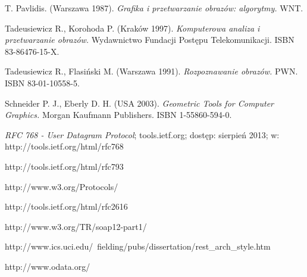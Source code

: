 \begin{thebibliography}{}

  T. Pavlidis.
  (Warszawa 1987).
  \emph{Grafika i przetwarzanie obrazów: algorytmy.}
  WNT.

  Tadeusiewicz R., Korohoda P.
  (Kraków 1997).
  \emph{Komputerowa analiza i przetwarzanie obrazów.}
  Wydawnictwo Fundacji Postępu Telekomunikacji.
  ISBN 83-86476-15-X.

  Tadeusiewicz R., Flasiński M.
  (Warszawa 1991).
  \emph{Rozpoznawanie obrazów.}
  PWN.
  ISBN 83-01-10558-5.
  
  Schneider P. J., Eberly D. H.
  (USA 2003).
  \emph{Geometric Tools for Computer Graphics.}
  Morgan Kaufmann Publishers.
  ISBN 1-55860-594-0.
  
  \emph{RFC 768 - User Datagram Protocol};
  tools.ietf.org;
  dostęp: sierpień 2013;
  w: http://tools.ietf.org/html/rfc768
 
  http://tools.ietf.org/html/rfc793
 
  http://www.w3.org/Protocols/
 
  http://tools.ietf.org/html/rfc2616
 
  http://www.w3.org/TR/soap12-part1/
 
  http://www.ics.uci.edu/~fielding/pubs/dissertation/rest\_arch\_style.htm
 
  http://www.odata.org/
                
\end{thebibliography}
